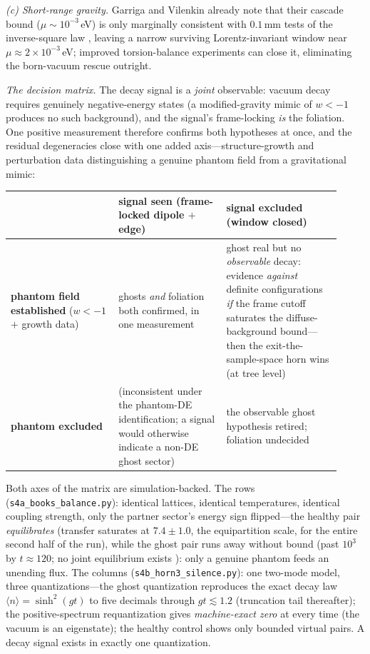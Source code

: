 \documentclass[11pt]{article}
\theoremstyle{definition}
\theoremstyle{remark}
\newcommand{\avg}[1]{\langle #1 \rangle}
\begin{document}
\emph{(c) Short-range gravity.} Garriga and Vilenkin already note that
their cascade bound ($\mu\sim10^{-3}\,$eV) is only marginally consistent
with $0.1\,$mm tests of the inverse-square law \cite{GV2013,Kapner2007},
leaving a narrow surviving Lorentz-invariant window near
$\mu\approx2\times10^{-3}\,$eV; improved torsion-balance experiments can close it,
eliminating the born-vacuum rescue outright.

\emph{The decision matrix.} The decay signal is a \emph{joint}
observable: vacuum decay requires genuinely negative-energy states
(a modified-gravity mimic of $w<-1$ produces no such background),
and the signal's frame-locking \emph{is} the foliation. One positive
measurement therefore confirms both hypotheses at once, and the
residual degeneracies close with one added axis---structure-growth
and perturbation data distinguishing a genuine phantom field from a
gravitational mimic:

\begin{center}
\begin{tabular}{@{}p{0.3\linewidth}p{0.3\linewidth}p{0.32\linewidth}@{}}
\toprule
 & \textbf{signal seen} (frame-locked dipole $+$ edge) &
 \textbf{signal excluded} (window closed)\\
\midrule
\textbf{phantom field established} ($w<-1$ $+$ growth data) &
ghosts \emph{and} foliation both confirmed, in one measurement &
ghost real but no \emph{observable} decay: evidence \emph{against} definite
configurations \emph{if} the frame cutoff saturates the diffuse-background
bound---then the exit-the-sample-space horn
\cite{BenderMannheim2008,HawkingHertog} wins (at tree level)\\
\midrule
\textbf{phantom excluded} &
(inconsistent under the phantom-DE identification; a signal would otherwise indicate a non-DE ghost sector) &
the observable ghost hypothesis retired; foliation undecided\\
\bottomrule
\end{tabular}
\end{center}

Both axes of the matrix are simulation-backed. The rows
(\texttt{s4a\_books\_balance.py}): identical lattices, identical
temperatures, identical coupling strength, only the partner
sector's energy sign flipped---the healthy pair \emph{equilibrates}
(transfer saturates at $7.4\pm1.0$, the equipartition scale, for
the entire second half of the run), while the ghost pair runs away
without bound (past $10^{3}$ by $t\approx120$; no joint equilibrium
exists \cite{GSTZ2021}): only a genuine phantom feeds an unending
flux. The columns (\texttt{s4b\_horn3\_silence.py}): one two-mode
model, three quantizations---the ghost quantization reproduces the
exact decay law $\avg n=\sinh^{2}(gt)$ to five decimals through
$gt\lesssim1.2$ (truncation tail thereafter); the
positive-spectrum requantization gives \emph{machine-exact zero} at
every time (the vacuum is an eigenstate); the healthy control shows
only bounded virtual pairs. A decay signal exists in exactly one
quantization.
\end{document}
